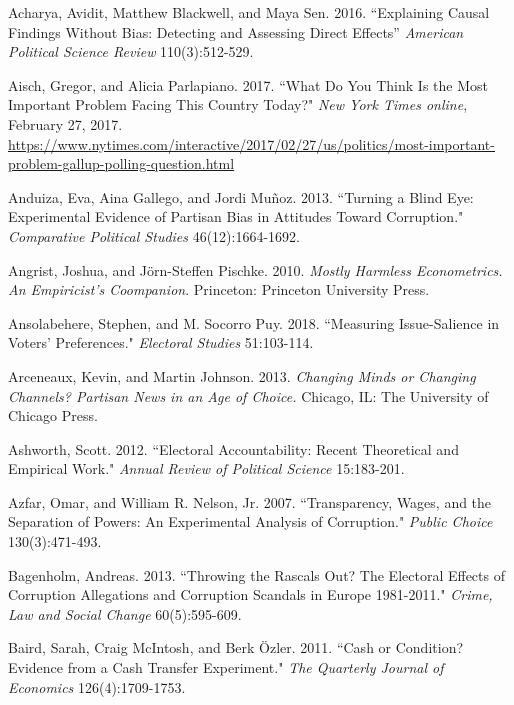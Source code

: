 \documentclass[11pt]{article}
\begin{document}
\newpage
\begin{thebibliography}{56}
\singlespacing

Acharya, Avidit, Matthew Blackwell, and Maya Sen. 2016. ``Explaining Causal Findings Without Bias: Detecting and Assessing Direct Effects'' \textit{American Political Science Review} 110(3):512-529.

Aisch, Gregor, and Alicia Parlapiano. 2017. “What Do You Think Is the Most Important Problem Facing This Country Today?" \textit{New York Times online}, February 27, 2017. \url{https://www.nytimes.com/interactive/2017/02/27/us/politics/most-important-problem-gallup-polling-question.html}

Anduiza, Eva, Aina Gallego, and Jordi Muñoz. 2013. “Turning a Blind Eye: Experimental Evidence of Partisan Bias in Attitudes Toward Corruption." \textit{Comparative Political Studies} 46(12):1664-1692. 

Angrist, Joshua, and Jörn-Steffen Pischke. 2010. \textit{Mostly Harmless Econometrics. An Empiricist's Coompanion}. Princeton: Princeton University Press.

Ansolabehere, Stephen, and M. Socorro Puy. 2018. “Measuring Issue-Salience in Voters' Preferences." \textit{Electoral Studies} 51:103-114.

Arceneaux, Kevin, and Martin Johnson. 2013. \textit{Changing Minds or Changing Channels? Partisan News in an Age of Choice.} Chicago, IL: The University of Chicago Press.

Ashworth, Scott. 2012. “Electoral Accountability: Recent Theoretical and Empirical Work." \textit{Annual Review of Political Science} 15:183-201.

Azfar, Omar, and William R. Nelson, Jr. 2007. “Transparency, Wages, and the Separation of Powers: An Experimental Analysis of Corruption." \textit{Public Choice} 130(3):471-493.

Bagenholm, Andreas. 2013. “Throwing the Rascals Out? The Electoral Effects of Corruption Allegations and Corruption Scandals in Europe 1981-2011." \textit{Crime, Law and Social Change} 60(5):595-609.

Baird, Sarah, Craig McIntosh, and Berk Özler. 2011. “Cash or Condition? Evidence from a Cash Transfer Experiment." \textit{The Quarterly Journal of Economics} 126(4):1709-1753.


\end{thebibliography}
\end{document}
